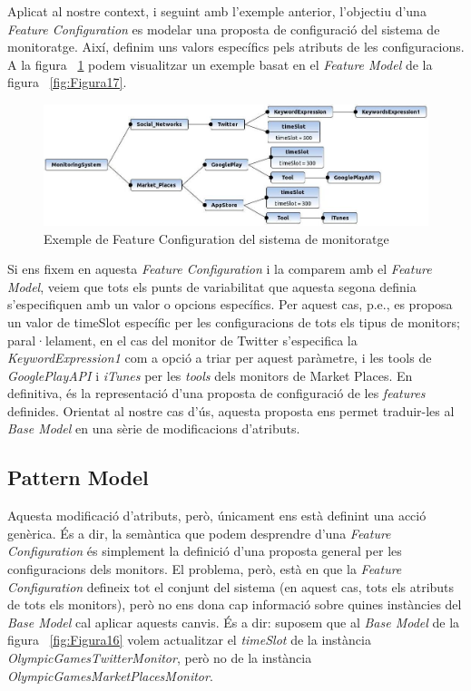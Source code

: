 Aplicat al nostre context, i seguint amb l'exemple anterior, l'objectiu d'una \textit{Feature Configuration} es modelar una proposta de configuració del sistema de monitoratge. Així, definim uns valors específics pels atributs de les configuracions. A la figura ~\ref{fig:Figura18} podem visualitzar un exemple basat en el \textit{Feature Model} de la figura ~\ref{fig:Figura17}.

\begin{figure}
\centering
\includegraphics[width=13cm]{Figures/Figure18}
\decoRule
\caption{Exemple de Feature Configuration del sistema de monitoratge}
\label{fig:Figura18}
\end{figure}

Si ens fixem en aquesta \textit{Feature Configuration} i la comparem amb el \textit{Feature Model}, veiem que tots els punts de variabilitat que aquesta segona definia s'especifiquen amb un valor o opcions específics. Per aquest cas, p.e., es proposa un valor de timeSlot específic per les configuracions de tots els tipus de monitors; paral·lelament, en el cas del monitor de Twitter s'especifica la \textit{KeywordExpression1} com a opció a triar per aquest paràmetre, i les tools de \textit{GooglePlayAPI} i \textit{iTunes} per les \textit{tools} dels monitors de Market Places. En definitiva, és la representació d'una proposta de configuració de les \textit{features} definides. Orientat al nostre cas d'ús, aquesta proposta ens permet traduir-les al \textit{Base Model} en una sèrie de modificacions d'atributs.\\

\subsection{Pattern Model}

Aquesta modificació d'atributs, però, únicament ens està definint una acció genèrica. És a dir, la semàntica que podem desprendre d'una \textit{Feature Configuration} és simplement la definició d'una proposta general per les configuracions dels monitors. El problema, però, està en que la \textit{Feature Configuration} defineix tot el conjunt del sistema (en aquest cas, tots els atributs de tots els monitors), però no ens dona cap informació sobre quines instàncies del \textit{Base Model} cal aplicar aquests canvis. És a dir: suposem que al \textit{Base Model} de la figura ~\ref{fig:Figura16} volem actualitzar el \textit{timeSlot} de la instància \textit{OlympicGamesTwitterMonitor}, però no de la instància \textit{OlympicGamesMarketPlacesMonitor}.\\

